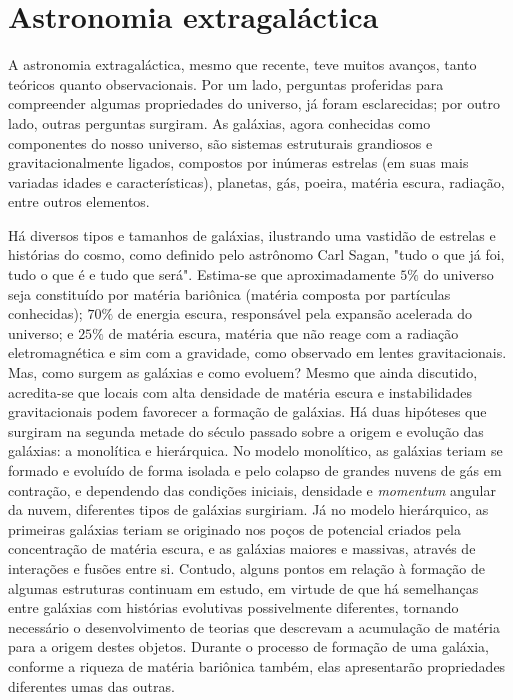 \section{Astronomia extragaláctica}

A astronomia extragaláctica, mesmo que recente, teve muitos avanços, tanto teóricos quanto observacionais. Por um lado, perguntas proferidas para compreender algumas propriedades do universo, já foram esclarecidas; por outro lado, outras perguntas surgiram. As galáxias, agora conhecidas como componentes do nosso universo, são sistemas estruturais grandiosos e gravitacionalmente ligados, compostos por inúmeras estrelas (em suas mais variadas idades e características), planetas, gás, poeira, matéria escura, radiação, entre outros elementos.

Há diversos tipos e tamanhos de galáxias, ilustrando uma vastidão de estrelas e histórias do cosmo, como definido pelo astrônomo Carl Sagan, "tudo o que já foi, tudo o que é e tudo que será". Estima-se que aproximadamente $5\%$ do universo seja constituído por matéria bariônica (matéria composta por partículas conhecidas); $70\%$ de energia escura, responsável pela expansão acelerada do universo; e $25\%$ de matéria escura, matéria que não reage com a radiação eletromagnética e sim com a gravidade, como observado em lentes gravitacionais. Mas, como surgem as galáxias e como evoluem? Mesmo que ainda discutido, acredita-se que locais com alta densidade de matéria escura e instabilidades gravitacionais podem favorecer a formação de galáxias. Há duas hipóteses que surgiram na segunda metade do século passado sobre a origem e evolução das galáxias: a monolítica e hierárquica. No modelo monolítico, as galáxias teriam se formado e evoluído de forma isolada e pelo colapso de grandes nuvens de gás em contração, e dependendo das condições iniciais, densidade e \emph{momentum} angular da nuvem, diferentes tipos de galáxias surgiriam. Já no modelo hierárquico, as primeiras galáxias teriam se originado nos poços de potencial criados pela concentração de matéria escura, e as galáxias maiores e massivas, através de interações e fusões entre si. Contudo, alguns pontos em relação à formação de algumas estruturas continuam em estudo, em virtude de que há semelhanças entre galáxias com histórias evolutivas possivelmente diferentes, tornando necessário o desenvolvimento de teorias que descrevam a acumulação de matéria para a origem destes objetos. Durante o processo de formação de uma galáxia, conforme a riqueza de matéria bariônica também, elas apresentarão propriedades diferentes umas das outras.

